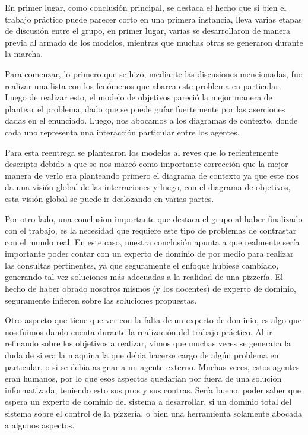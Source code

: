 \documentclass[a4paper,10pt]{article}
\begin{document}
En primer lugar, como conclusi\'on principal, se destaca el hecho que si bien el trabajo pr\'actico puede parecer corto en una primera instancia,
lleva varias etapas de discusi\'on entre el grupo, en primer lugar, varias se desarrollaron de manera previa al armado de los modelos, mientras
que muchas otras se generaron durante la marcha.

Para comenzar, lo primero que se hizo, mediante las discusiones mencionadas, fue realizar una lista con los fen\'omenos que abarca este problema
en particular. Luego de realizar esto, el modelo de objetivos pareci\'o la mejor manera de plantear el problema, dado que se puede gu\'iar
fuertemente por las aserciones dadas en el enunciado. Luego, nos abocamos a los diagramas de contexto, donde cada uno representa una interacci\'on
particular entre los agentes.

Para esta reentrega se plantearon los modelos al reves que lo recientemente descripto debido a que se nos marc\'o como importante correcci\'on que la mejor manera de verlo era planteando primero el diagrama de contexto ya que este nos da una visi\'on global de las interraciones y luego, con el diagrama de objetivos, esta visi\'on global se puede ir deslozando en varias partes.


\medskip

Por otro lado, una conclusion importante que destaca el grupo al haber finalizado con el trabajo, es la necesidad que requiere este tipo de
problemas de contrastar con el mundo real. En este caso, nuestra conclusi\'on apunta a que realmente ser\'ia importante poder contar con un 
experto de dominio de por medio para realizar las consultas pertinentes, ya que seguramente el enfoque hubiese cambiado, generando tal vez soluciones
m\'as adecuadas a la realidad de una pizzer\'ia. El hecho de haber obrado nosotros mismos (y los docentes) de experto de dominio, seguramente infieren
sobre las soluciones propuestas.

Otro aspecto que tiene que ver con la falta de un experto de dominio, es algo que nos fuimos dando cuenta durante la realizaci\'on del trabajo pr\'actico.
Al ir refinando sobre los objetivos a realizar, vimos que muchas veces se generaba la duda de si era la maquina la que debia hacerse cargo de
alg\'un problema en particular, o si se deb\'ia asignar a un agente externo. Muchas veces, estos agentes eran humanos, por lo que esos aspectos
quedar\'ian por fuera de una soluci\'on informatizada, teniendo esto sus pros y sus contras. Ser\'ia bueno, poder saber que espera un experto de 
dominio del sistema a desarrollar, si un dominio total del sistema sobre el control de la pizzer\'ia, o bien una herramienta solamente abocada a algunos
aspectos.
\end{document}
